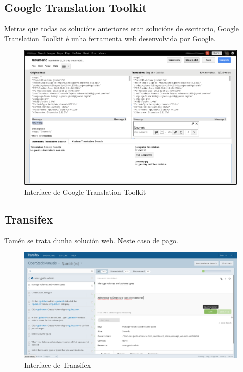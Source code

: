 \subsection{Google Translation Toolkit}
Metras que todas as solucións anteriores eran solucións de escritorio, Google Translation Toolkit é unha ferramenta web desenvolvida por Google.

\begin{figure}[h]
    \centering
    \includegraphics[width=\textwidth]{img/captura_googletranslationtoolkit.png}
    \caption{Interface de Google Translation Toolkit}
    \label{fig:translatetoolkit}
\end{figure}

\subsection{Transifex}
Tamén se trata dunha solución web. Neste caso de pago.

\begin{figure}[h]
    \centering
    \includegraphics[width=\textwidth]{img/captura_transifex.png}
    \caption{Interface de Transifex}
    \label{fig:transifex}
\end{figure}


%
%